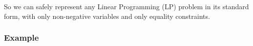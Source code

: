 \documentclass[twocolumn]{ctexart}
\begin{document}
So we can safely represent any Linear Programming (LP) problem in its standard form,
with only non-negative variables and only equality constraints.





\subsubsection{Example}
\end{document}
